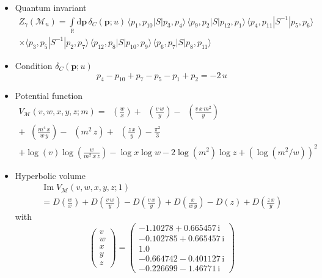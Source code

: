 \documentclass[12pt,reqno]{amsart}
\numberwithin{equation}{section}
\renewcommand{\Im}{\operatorname{Im}}
\DeclareMathOperator{\Li}{Li_2}
\newcommand{\I}{\mathrm{i}}
\begin{document}
\begin{itemize}
\item Quantum invariant
  \begin{multline*}
    Z_\gamma \left( \mathcal{M}_u \right)
    =
    \int\limits_{\mathbb{R}}
    \mathrm{d} \boldsymbol{p} \,
    \delta_C(\boldsymbol{p}; u ) \,
    \langle p_1, p_{10} | S| p_3 , p_4 \rangle \,
    \langle p_9, p_{2} | S| p_{12} , p_1 \rangle \,
    \langle p_4, p_{11} | S^{-1} | p_5 , p_6 \rangle
    \\
    \times
    \langle p_3, p_{5} | S^{-1} | p_2 , p_7 \rangle \,
    \langle p_{12}, p_{8} | S| p_{10} , p_9 \rangle \,
    \langle p_6, p_{7} | S| p_8 , p_{11} \rangle 
  \end{multline*}

\item
Condition $\delta_C(\boldsymbol{p};u)$
\begin{equation*}
  p_4-p_{10} + p_7 - p_5 - p_1 + p_2 = - 2 \, u 
\end{equation*}

\item Potential function
\begin{multline*}
  V_{\mathcal{M}}(v,w,x,y,z ; m)
  =
  \Li\left(\frac{w}{x}\right) +   \Li\left(\frac{v \, w}{y}\right)
  -   \Li\left(\frac{v \, x \, m^2}{y}\right)
  \\
  +  \Li\left(\frac{m^4 \, x}{w \, y}\right)
  - \Li\left(m^2 \, z\right)
  + \Li\left(\frac{z\, x}{y}\right)
  -\frac{\pi^2}{3}
  \\
  + \log(v) \log \left( \frac{w}{m^2 \, x \, z}\right)
  - \log x \log w - 2 \log \left(m^2\right) \log z
  +
  \left( \log \left(m^2/w\right) \right)^2
\end{multline*}


\item Hyperbolic volume
  \begin{multline*}
    \Im V_{\mathcal{M}}(v,w,x,y,z ; 1)
    \\
    =
    D\left(\frac{w}{x}\right)
    +   D\left(\frac{v \, w}{y}\right)
    -   D\left(\frac{v \, x }{y}\right)
    +  D\left(\frac{ x}{w \, y}\right)
    - D\left( z\right)
    + D\left(\frac{z\, x}{y}\right)
  \end{multline*}
  with
  \begin{equation*}
    \begin{pmatrix}
      v \\ w \\ x\\ y \\ z
    \end{pmatrix}
    =
    \begin{pmatrix}
      -1.10278 + 0.665457 \, \I
      \\
      -0.102785 + 0.665457 \, \I
      \\
      1.0
      \\
      -0.664742 - 0.401127 \, \I
      \\
      -0.226699 - 1.46771 \, \I
    \end{pmatrix}
  \end{equation*}


\end{itemize}
\end{document}
